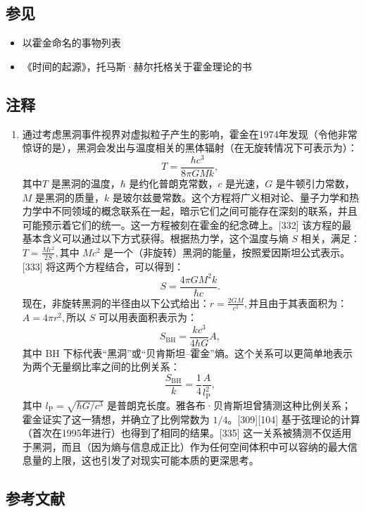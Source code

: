 \subsection{参见}
\begin{itemize}
\item 以霍金命名的事物列表  
\item 《时间的起源》，托马斯·赫尔托格关于霍金理论的书
\end{itemize}
\subsection{注释}  
\begin{enumerate}
\item 通过考虑黑洞事件视界对虚拟粒子产生的影响，霍金在1974年发现（令他非常惊讶的是），黑洞会发出与温度相关的黑体辐射（在无旋转情况下可表示为）：
\[ T = \frac{\hbar c^{3}}{8 \pi G M k},~\]
其中\( T \) 是黑洞的温度，\( \hbar \) 是约化普朗克常数，\( c \) 是光速，\( G \) 是牛顿引力常数， \( M \) 是黑洞的质量，\( k \) 是玻尔兹曼常数。这个方程将广义相对论、量子力学和热力学中不同领域的概念联系在一起，暗示它们之间可能存在深刻的联系，并且可能预示着它们的统一。这一方程被刻在霍金的纪念碑上。[332] 该方程的最基本含义可以通过以下方式获得。根据热力学，这个温度与熵 \( S \) 相关，满足：\(T = \frac{Mc^{2}}{2S}, \)其中 \( Mc^{2} \) 是一个（非旋转）黑洞的能量，按照爱因斯坦公式表示。[333] 将这两个方程结合，可以得到：
\[ S = \frac{4\pi G M^{2} k}{\hbar c}.~\]
现在，非旋转黑洞的半径由以下公式给出：\(r = \frac{2GM}{c^{2}}, \)并且由于其表面积为：\(A = 4\pi r^{2}, \)所以 \( S \) 可以用表面积表示为：
\[ S_{\text{BH}} = \frac{k c^{3}}{4\hbar G} A,~\]
其中 BH 下标代表“黑洞”或“贝肯斯坦–霍金”熵。这个关系可以更简单地表示为两个无量纲比率之间的比例关系：
\[ \frac{S_{\text{BH}}}{k} = \frac{1}{4} \frac{A}{l_{\text{P}}^{2}},~\]
其中 \( l_{\text{P}} = \sqrt{\hbar G / c^{3}} \) 是普朗克长度。雅各布·贝肯斯坦曾猜测这种比例关系；霍金证实了这一猜想，并确立了比例常数为 \( 1/4 \)。[309][104] 基于弦理论的计算（首次在1995年进行）也得到了相同的结果。[335] 这一关系被猜测不仅适用于黑洞，而且（因为熵与信息成正比）作为任何空间体积中可以容纳的最大信息量的上限，这也引发了对现实可能本质的更深思考。
\end{enumerate}
\subsection{参考文献} 
